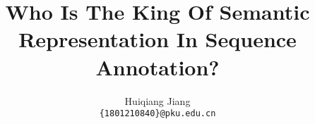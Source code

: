\documentclass[11pt,a4paper]{article}
\title{Who Is The King Of Semantic Representation In Sequence Annotation?}
\author{Huiqiang Jiang \\
  {\tt \{1801210840\}@pku.edu.cn} \\}
\date{}
\begin{document}
\maketitle
\begin{abstract}
  
\end{abstract}











\end{document}

